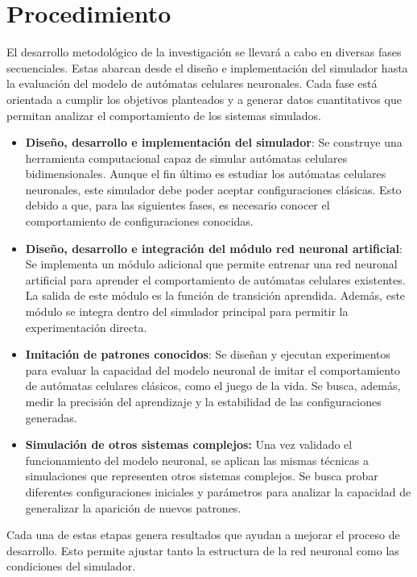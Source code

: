 \section{Procedimiento}

El desarrollo metodológico de la investigación se llevará a cabo en diversas fases secuenciales. Estas abarcan desde el diseño e implementación del simulador hasta la evaluación del modelo de autómatas celulares neuronales. Cada fase está orientada a cumplir los objetivos planteados y a generar datos cuantitativos que permitan analizar el comportamiento de los sistemas simulados.

\begin{itemize}
	
	\item \textbf{Diseño, desarrollo e implementación del simulador}: Se construye una herramienta computacional capaz de simular autómatas celulares bidimensionales. Aunque el fin último es estudiar los autómatas celulares neuronales, este simulador debe poder aceptar configuraciones clásicas. Esto debido a que, para las siguientes fases, es necesario conocer el comportamiento de configuraciones conocidas.
	
	\item \textbf{Diseño, desarrollo e integración del módulo red neuronal artificial}: Se implementa un módulo adicional que permite entrenar una red neuronal artificial para aprender el comportamiento de autómatas celulares existentes. La salida de este módulo es la función de transición aprendida. Además, este módulo se integra dentro del simulador principal para permitir la experimentación directa.
		
	\item \textbf{Imitación de patrones conocidos}: Se diseñan y ejecutan experimentos para evaluar la capacidad del modelo neuronal de imitar el comportamiento de autómatas celulares clásicos, como el juego de la vida. Se busca, además, medir la precisión del aprendizaje y la estabilidad de las configuraciones generadas. 
		
	\item \textbf{Simulación de otros sistemas complejos:} Una vez validado el funcionamiento del modelo neuronal, se aplican las mismas técnicas a simulaciones que representen otros sistemas complejos. Se busca probar diferentes configuraciones iniciales y parámetros para analizar la capacidad de generalizar la aparición de nuevos patrones.
	
\end{itemize}

Cada una de estas etapas genera resultados que ayudan a mejorar el proceso de desarrollo. Esto permite ajustar tanto la estructura de la red neuronal como las condiciones del simulador.

